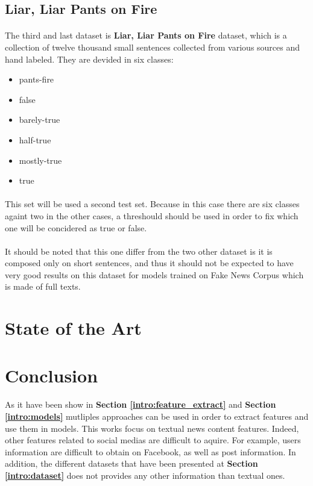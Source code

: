 \subsection{Liar, Liar Pants on Fire}
\paragraph{}
The third and last dataset is \textbf{Liar, Liar Pants on Fire} dataset\cite{Wang2017}, which is a collection of twelve thousand small sentences collected from various sources and hand labeled. They are devided in six classes:
\begin{itemize}
	\item pants-fire
	\item false
	\item barely-true
	\item half-true
	\item mostly-true
	\item true
\end{itemize} 
\paragraph{}
This set will be used a second test set. Because in this case there are six classes againt two in the other cases, a threshould should be used in order to fix which one will be concidered as true or false. 
\paragraph{}
It should be noted that this one differ from the two other dataset is it is composed only on short sentences, and thus it should not be expected to have very good results on this dataset for models trained on Fake News Corpus which is made of full texts. 

\section{State of the Art}
\section{Conclusion}
\paragraph{} As it have been show in \textbf{Section \ref{intro:feature_extract}} and \textbf{Section \ref{intro:models}} mutliples approaches can be used in order to extract features and use them in models. This works focus on textual news content features. Indeed, other features related to social medias are difficult to aquire. For example, users information are difficult to obtain on Facebook, as well as post information. In addition, the different datasets that have been presented at \textbf{Section \ref{intro:dataset}} does not provides any other information than textual ones. 

